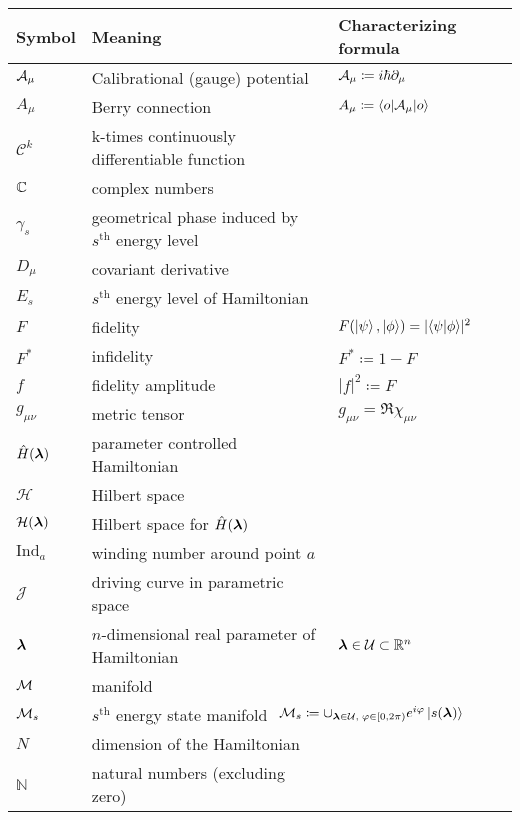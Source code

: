 

\begin{tabular} {@{}C{1.9cm}@{}p{8cm}@{}C{3.77cm}}
	\toprule
	\textbf{Symbol}& \textbf{Meaning}& \hspace{-30pt}\textbf{Characterizing formula}\\\bottomrule
	$\mathcal{A}_\mu$ & Calibrational (gauge) potential & $\mathcal{A}_\mu\coloneqq i\hbar \partial_\mu$ \\
	$A_\mu$ & Berry connection & $A_\mu\coloneqq \braket{o|\mathcal{A}_\mu|o}$ \\
	$\mathcal{C}^k$ & k-times continuously differentiable function \\
	$\mathbb{C}$ & complex numbers & \\
	  $\gamma_s$& geometrical phase induced by $s^{\text{th}}$ energy level &  \\
	  $D_\mu$&covariant derivative  &  \\
	  $E_s$&$s^{\text{th}}$ energy level of Hamiltonian &  \\
	  $F$& fidelity & \hspace{-7pt}$F(\ket{\psi},\ket{\phi})=|\!\braket{\psi|\phi}\!|^2$  \\
	  $F^*$& infidelity & $F^*\coloneqq 1-F$  \\
	  $f$& fidelity amplitude  & $|f|^2\coloneqq F$  \\
	  $g_{\mu\nu}$& metric tensor& $g_{\mu\nu}= \Re\chi_{\mu\nu}$ \\
	  $\hat{H}({\bm\lambda})$& parameter controlled Hamiltonian  &  \\ 
	  $\mathcal H$& Hilbert space  &  \\ 
	  $\mathcal H({\bm\lambda})$& Hilbert space for $\hat{H}({\bm\lambda})$ &  \\ 
	  $\mathrm{Ind}_a$ & winding number around point $a$ & \\
	  $\mathcal J$ & driving curve in parametric space &  \\
	  ${\bm\lambda}$& $n$-dimensional real parameter of Hamiltonian &${\bm\lambda}\in \mathcal U\subset \mathbb{R}^n$  \\
	  $\mathcal{M}$& manifold &  \\
	  $\mathcal{M}_s$& $s^{\text{th}}$ energy state manifold & $\hspace{-43pt}\M_s\coloneqq\cup_{\llambda\in\mathcal U,\;\varphi\in[0,2\pi)} e^{i\varphi}\ket{s(\llambda)}$ \\
	  $N$ & dimension of the Hamiltonian & \\
	  $\mathbb{N}$ & natural numbers (excluding zero) \\

\end{tabular}
